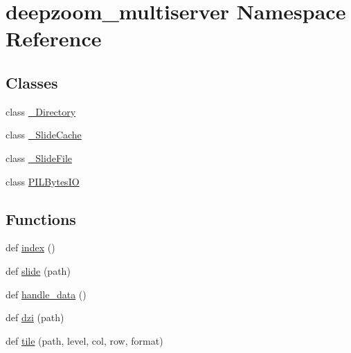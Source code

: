 \hypertarget{namespacedeepzoom__multiserver}{}\section{deepzoom\+\_\+multiserver Namespace Reference}
\label{namespacedeepzoom__multiserver}
\subsection*{Classes}
\begin{DoxyCompactItemize}
\item 
class \hyperlink{classdeepzoom__multiserver_1_1__Directory}{\+\_\+\+Directory}
\item 
class \hyperlink{classdeepzoom__multiserver_1_1__SlideCache}{\+\_\+\+Slide\+Cache}
\item 
class \hyperlink{classdeepzoom__multiserver_1_1__SlideFile}{\+\_\+\+Slide\+File}
\item 
class \hyperlink{classdeepzoom__multiserver_1_1PILBytesIO}{P\+I\+L\+Bytes\+IO}
\end{DoxyCompactItemize}
\subsection*{Functions}
\begin{DoxyCompactItemize}
\item 
def \hyperlink{namespacedeepzoom__multiserver_a9b00bda79f7bb2c81831f90df5b7fbd3}{index} ()
\item 
def \hyperlink{namespacedeepzoom__multiserver_a4d8664b2e2f006c8eaee41b95ff9ac32}{slide} (path)
\item 
def \hyperlink{namespacedeepzoom__multiserver_ae5aeab5ad3eb3d8df05ef0ecbce34f93}{handle\+\_\+data} ()
\item 
def \hyperlink{namespacedeepzoom__multiserver_a213d1b03dc1051e9011528b975a144ec}{dzi} (path)
\item 
def \hyperlink{namespacedeepzoom__multiserver_a633157037a59696c55ee277585045681}{tile} (path, level, col, row, format)
\end{DoxyCompactItemize}
